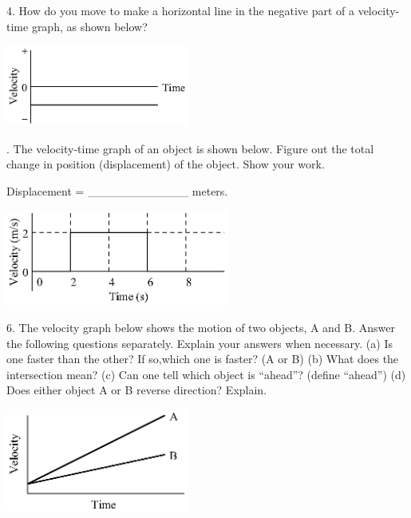 4. How do you move to make a horizontal line in the negative part of a velocity-time
graph, as shown below?

\vspace{0.3cm}
{\par\raggedright \includegraphics[width=0.45\textwidth]{velocity/velocity_fig11.eps} \par}
\answerspace{0.3cm}

. The velocity-time graph of an object is shown below. Figure out the total
change in position (displacement) of the object. Show your work.

Displacement = \_\_\_\_\_\_\_\_\_\_\_\_ meters.

\vspace{0.3cm}
{\par\raggedright \includegraphics[width=0.55\textwidth]{velocity/velocity_fig12.eps} \par}
\answerspace{0.6cm}

6. The velocity graph below shows the motion of two objects, A and B. Answer
the following questions separately. Explain your answers when necessary. (a)
Is one faster than the other? If so,which one is faster? (A or B) (b) What does
the intersection mean? (c) Can one tell which object is ``ahead''?
(define ``ahead'') (d) Does either object A or B reverse direction?
Explain.

\vspace{0.3cm}
{\par\raggedright \includegraphics[width=0.45\textwidth]{velocity/velocity_fig13.eps} \par}
\answerspace{0.6cm}

